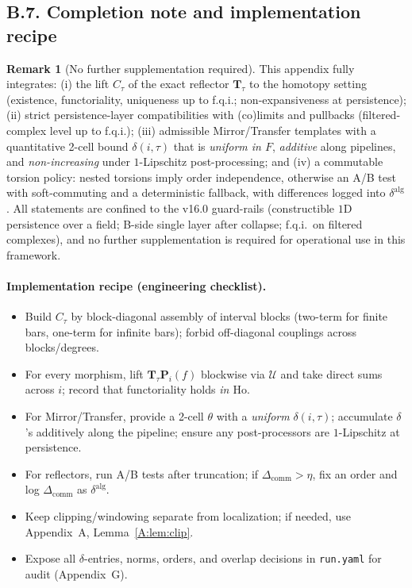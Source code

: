 \documentclass[11pt]{article}
\numberwithin{equation}{section}
\theoremstyle{plain}
\theoremstyle{definition}
\theoremstyle{remark}
\DeclareRobustCommand{\hyp}{\nobreakdash-}
\newcommand{\Ho}{\mathrm{Ho}}
\theoremstyle{plain}
\theoremstyle{definition}
\numberwithin{equation}{section}
\theoremstyle{definition}
\newtheorem{remark}[theorem]{Remark}
\numberwithin{equation}{section}
\theoremstyle{plain}
\theoremstyle{definition}
\theoremstyle{remark}
\begin{document}
\subsection*{B.7. Completion note and implementation recipe}
\begin{remark}[No further supplementation required]
This appendix fully integrates: (i) the lift \(C_\tau\) of the exact reflector \(\mathbf{T}_\tau\) to the homotopy setting (existence, functoriality, uniqueness up to f.q.i.; non\hyp expansiveness at persistence); (ii) strict persistence\hyp layer compatibilities with (co)limits and pullbacks (filtered\hyp complex level up to f.q.i.); (iii) admissible Mirror/Transfer templates with a quantitative 2\hyp cell bound \(\delta(i,\tau)\) that is \emph{uniform in \(F\)}, \emph{additive} along pipelines, and \emph{non\hyp increasing} under \(1\)\hyp Lipschitz post\hyp processing; and (iv) a commutable torsion policy: nested torsions imply order independence, otherwise an A/B test with soft\hyp commuting and a deterministic fallback, with differences logged into \(\delta^{\mathrm{alg}}\).
All statements are confined to the v16.0 guard\hyp rails (constructible \(1\)D persistence over a field; B\hyp side single layer after collapse; f.q.i.\ on filtered complexes), and no further supplementation is required for operational use in this framework.
\end{remark}

\paragraph{Implementation recipe (engineering checklist).}
\begin{itemize}
  \item Build \(C_\tau\) by block\hyp diagonal assembly of interval blocks (two-term for finite bars, one-term for infinite bars); forbid off-diagonal couplings across blocks/degrees.
  \item For every morphism, lift \(\mathbf{T}_\tau\mathbf{P}_i(f)\) blockwise via \(\mathcal{U}\) and take direct sums across \(i\); record that functoriality holds \emph{in \(\Ho\)}.
  \item For Mirror/Transfer, provide a 2\hyp cell \(\theta\) with a \emph{uniform} \(\delta(i,\tau)\); accumulate \(\delta\)'s additively along the pipeline; ensure any post\hyp processors are \(1\)\hyp Lipschitz at persistence.
  \item For reflectors, run A/B tests after truncation; if \(\Delta_{\mathrm{comm}}>\eta\), fix an order and log \(\Delta_{\mathrm{comm}}\) as \(\delta^{\mathrm{alg}}\).
  \item Keep clipping/windowing separate from localization; if needed, use Appendix~A, Lemma~\ref{A:lem:clip}.
  \item Expose all \(\delta\)\hyp entries, norms, orders, and overlap decisions in \texttt{run.yaml} for audit (Appendix~G).
\end{itemize}
\end{document}
